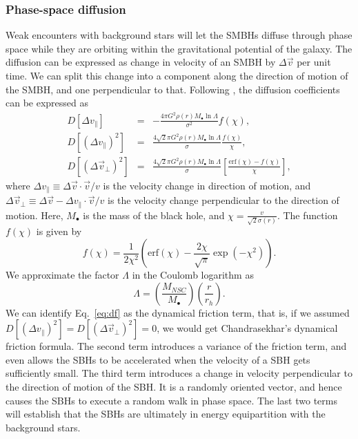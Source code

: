 \documentclass[english, apj]{emulateapj}
\begin{document}
\subsubsection{Phase-space diffusion} \label{psd}
Weak encounters with background stars will let the SMBHs diffuse through phase space while they are orbiting within the gravitational potential of the galaxy. The diffusion can be expressed as change in velocity of an SMBH by $\Delta \vec{v}$ per unit time. We can split this change into a component along the direction of motion of the SMBH, and one perpendicular to that. Following \citet{2008gady.book.....B}, the diffusion coefficients can be expressed as 
\begin{eqnarray}
D[\Delta v_\parallel] & = & -\frac{4\pi G^2\rho(r)M_\bullet\ln\Lambda}{\sigma^2}f(\chi),\label{eq:df}\\
D[(\Delta v_\parallel)^2] & = & \frac{4\sqrt{2}\pi G^2\rho(r)M_\bullet\ln\Lambda}{\sigma}\frac{f(\chi)}{\chi},\\
D[(\Delta \vec{v}_\bot)^2] & = & \frac{4\sqrt{2}\pi G^2\rho(r)M_\bullet\ln\Lambda}{\sigma}\left[\frac{\mbox{erf}(\chi)-f(\chi)}{\chi}\right],
\end{eqnarray} 
where $\Delta v_\parallel \equiv \Delta \vec{v}\cdot\vec{v}/v$ is the velocity change in direction of motion, and $\Delta \vec{v}_\bot \equiv \Delta \vec{v} - \Delta v_\parallel \cdot\vec{v}/v$ is the velocity change perpendicular to the direction of motion. Here, $M_\bullet$ is the mass of the black hole, and $\chi = \frac{v}{\sqrt{2}\sigma(r)}$. The function $f(\chi)$ is given by 
\begin{equation}
f(\chi) = \frac{1}{2\chi^2}\left(\mbox{erf}(\chi)-\frac{2\chi}{\sqrt{\pi}}\exp\left(-\chi^2\right)\right).
\end{equation}
We approximate the factor $\Lambda$ in the Coulomb logarithm as
\begin{equation}
\Lambda = \left(\frac{M_{NSC}}{M_\bullet}\right)\left(\frac{r}{r_h}\right).
\end{equation}
We can identify Eq.~\ref{eq:df} as the dynamical friction term, that is, if we assumed $D[(\Delta v_\parallel)^2]  = D[(\Delta \vec{v}_\bot)^2]  = 0$, we would get Chandrasekhar's dynamical friction formula. The second term introduces a variance of the friction term, and even allows the SBHs to be accelerated when the velocity of a SBH gets sufficiently small. The third term introduces a change in velocity perpendicular to the direction of motion of the SBH. It is a randomly oriented vector, and hence causes the SBHs to execute a random walk in phase space. The last two terms will establish that the SBHs are ultimately in energy equipartition with the background stars.
\end{document}
